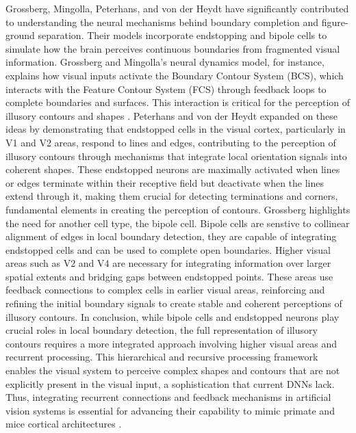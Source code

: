 \documentclass[12pt]{article}
\begin{document}
Grossberg, Mingolla, Peterhans, and von der Heydt have significantly contributed to understanding the neural mechanisms behind boundary completion and figure-ground separation. Their models incorporate endstopping and bipole cells to simulate how the brain perceives continuous boundaries from fragmented visual information. Grossberg and Mingolla's neural dynamics model, for instance, explains how visual inputs activate the Boundary Contour System (BCS), which interacts with the Feature Contour System (FCS) through feedback loops to complete boundaries and surfaces. This interaction is critical for the perception of illusory contours and shapes \autocite{grossbergTextureSegregationSurface1998}. Peterhans and von der Heydt expanded on these ideas by demonstrating that endstopped cells in the visual cortex, particularly in V1 and V2 areas, respond to lines and edges, contributing to the perception of illusory contours through mechanisms that integrate local orientation signals into coherent shapes\autocite{grossbergTextureSegregationSurface1998}. These endstopped neurons are maximally activated when lines or edges terminate within their receptive field but deactivate when the lines extend through it, making them crucial for detecting terminations and corners, fundamental elements in creating the perception of contours. Grossberg highlights the need for another cell type, the bipole cell. Bipole cells are senstive to collinear alignment of edges in local boundary detection, they are capable of integrating endstopped cells and can be used to complete open boundaries. Higher visual areas such as V2 and V4 are necessary for integrating information over larger spatial extents and bridging gaps between endstopped points. These areas use feedback connections to complex cells in earlier visual areas, reinforcing and refining the initial boundary signals to create stable and coherent perceptions of illusory contours.
\bigbreak
In conclusion, while bipole cells and endstopped neurons play crucial roles in local boundary detection, the full representation of illusory contours requires a more integrated approach involving higher visual areas and recurrent processing. This hierarchical and recursive processing framework enables the visual system to perceive complex shapes and contours that are not explicitly present in the visual input, a sophistication that current DNNs lack. Thus, integrating recurrent connections and feedback mechanisms in artificial vision systems is essential for advancing their capability to mimic primate and mice cortical architectures \autocite{grossbergHowVisualIllusions2014,grossbergTextureSegregationSurface1998}. 
\end{document}
